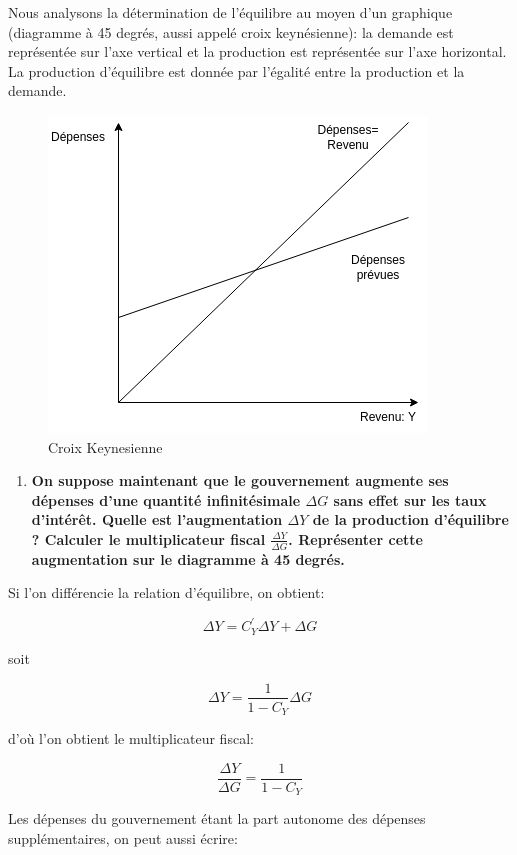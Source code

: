 \documentclass[
]{article}
\providecommand{\tightlist}{%
  \setlength{\itemsep}{0pt}\setlength{\parskip}{0pt}}
\begin{document}
Nous analysons la détermination de l'équilibre au moyen d'un graphique
(diagramme à 45 degrés, aussi appelé croix keynésienne): la demande est
représentée sur l'axe vertical et la production est représentée sur
l'axe horizontal. La production d'équilibre est donnée par l'égalité
entre la production et la demande.

\begin{figure}
\centering
\includegraphics{cross.png}
\caption{Croix Keynesienne}
\end{figure}

\begin{enumerate}
\def\labelenumi{\arabic{enumi}.}
\tightlist
\item
  \textbf{On suppose maintenant que le gouvernement augmente ses
  dépenses d'une quantité infinitésimale \(\Delta G\) sans effet sur les
  taux d'intérêt. Quelle est l'augmentation \(\Delta Y\) de la
  production d'équilibre ? Calculer le multiplicateur fiscal
  \(\frac{\Delta Y}{\Delta G}\). Représenter cette augmentation sur le
  diagramme à 45 degrés.}
\end{enumerate}

Si l'on différencie la relation d'équilibre, on obtient:

\[\Delta Y = C_Y^{\prime} \Delta Y + \Delta G\]

soit

\[\boxed{\Delta Y= \frac{1}{1-C_Y}\Delta G}\]

d'où l'on obtient le multiplicateur fiscal:

\[\boxed{\frac{\Delta Y}{\Delta G}= \frac{1}{1-C_Y}}\]

Les dépenses du gouvernement étant la part autonome des dépenses
supplémentaires, on peut aussi écrire:
\end{document}
